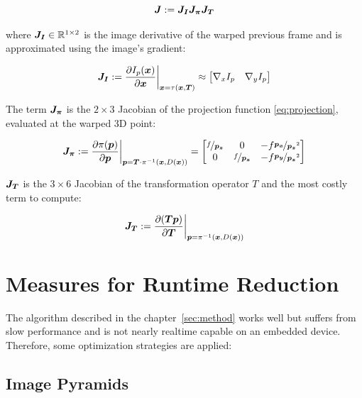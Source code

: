 \begin{equation}
    \mat{J} := \mat{J_I} \mat{J_{\pi}} \mat{J_T}
\end{equation}

where $\mat{J_I} \in \mathbb{R}^{1 \times 2}$ is the image derivative of the warped previous frame and is
approximated using the image's gradient:

\begin{equation}
    \mat{J_I} := \frac{\partial I_p(\vec{x})} {\partial \vec{x}} \bigg|_{\vec{x} = \tau(\vec{x}, \vec{T})}
    \approx
    \begin{bmatrix}
        \nabla{}_x I_p & \nabla{}_y I_p
    \end{bmatrix}
\end{equation}

The term $\mat{J_{\pi}}$ is the $2 \times 3$ Jacobian of the projection
function \ref{eq:projection}, evaluated at the warped 3D point:

\begin{equation}
    \mat{J_{\pi}} := \frac{\partial \pi(\vec{p})}{\partial \vec{p}}
    \bigg|_{\vec{p} = \vec{T}\cdot\pi^{-1}(\vec{x},D(\vec{x}))}
    =
    \begin{bmatrix}
        \nicefrac{f}{\vec{p_z}} & 0 & -f \nicefrac{\vec{p_x}}{\vec{p_z}^2} \\
        0 & \nicefrac{f}{\vec{p_z}} & -f \nicefrac{\vec{p_y}}{\vec{p_z}^2}
    \end{bmatrix}
\end{equation}

$\mat{J_T}$ is the $3 \times 6$ Jacobian of the transformation operator $T$ and
the most costly term to compute:

\begin{equation}
    \mat{J_T} := \frac{\partial (\vec{T} \vec{p})}{\partial \vec{T}}
    \bigg|_{\vec{p} = \pi^{-1}(\vec{x}, D(\vec{x}))}
\end{equation}




\section{Measures for Runtime Reduction}
\label{sec:optimizations}

The algorithm described in the chapter~\ref{sec:method} works well but suffers from
slow performance and is not nearly realtime capable on an embedded device.
Therefore, some optimization strategies are applied:

\subsection{Image Pyramids}
\label{sec:pyramids}

